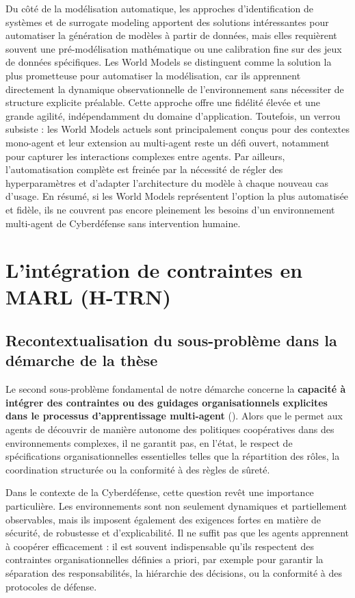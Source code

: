 Du côté de la modélisation automatique, les approches d'identification de systèmes et de surrogate modeling apportent des solutions intéressantes pour automatiser la génération de modèles à partir de données, mais elles requièrent souvent une pré-modélisation mathématique ou une calibration fine sur des jeux de données spécifiques. Les World Models se distinguent comme la solution la plus prometteuse pour automatiser la modélisation, car ils apprennent directement la dynamique observationnelle de l'environnement sans nécessiter de structure explicite préalable. Cette approche offre une fidélité élevée et une grande agilité, indépendamment du domaine d'application. Toutefois, un verrou subsiste : les World Models actuels sont principalement conçus pour des contextes mono-agent et leur extension au multi-agent reste un défi ouvert, notamment pour capturer les interactions complexes entre agents. Par ailleurs, l'automatisation complète est freinée par la nécessité de régler des hyperparamètres et d'adapter l'architecture du modèle à chaque nouveau cas d'usage. En résumé, si les World Models représentent l'option la plus automatisée et fidèle, ils ne couvrent pas encore pleinement les besoins d'un environnement multi-agent de Cyberdéfense sans intervention humaine.

\section{L'intégration de contraintes en MARL (H-TRN)}

\subsection*{Recontextualisation du sous-problème dans la démarche de la thèse}

Le second sous-problème fondamental de notre démarche concerne la \textbf{capacité à intégrer des contraintes ou des guidages organisationnels explicites dans le processus d'apprentissage multi-agent} (). Alors que le  permet aux agents de découvrir de manière autonome des politiques coopératives dans des environnements complexes, il ne garantit pas, en l'état, le respect de spécifications organisationnelles essentielles telles que la répartition des rôles, la coordination structurée ou la conformité à des règles de sûreté.

Dans le contexte de la Cyberdéfense, cette question revêt une importance particulière. Les environnements sont non seulement dynamiques et partiellement observables, mais ils imposent également des exigences fortes en matière de sécurité, de robustesse et d'explicabilité. Il ne suffit pas que les agents apprennent à coopérer efficacement : il est souvent indispensable qu'ils respectent des contraintes organisationnelles définies a priori, par exemple pour garantir la séparation des responsabilités, la hiérarchie des décisions, ou la conformité à des protocoles de défense.

